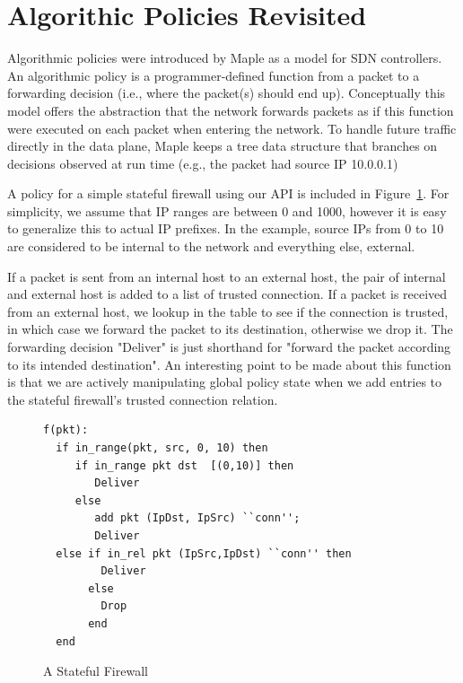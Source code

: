 \documentclass[preprint]{sigplanconf}
\begin{document}
\section*{Algorithic Policies Revisited}
Algorithmic policies were introduced by Maple as a model for SDN controllers. An algorithmic policy is a programmer-defined function from a packet to a forwarding decision (i.e., where the packet(s) should end up). Conceptually this model offers the abstraction that the network forwards packets as if this function were executed on each packet when entering the network. To handle future traffic directly in the data plane, Maple keeps a tree data structure that branches on decisions observed at run time (e.g., the packet had source IP 10.0.0.1)


A policy for a simple stateful firewall using our API is included in Figure~\ref{fig:firewallcode}. For simplicity, we assume that IP ranges are between 0 and 1000, however it is easy to generalize this to actual IP prefixes.
In the example, source IPs from 0 to 10 are considered to be internal to the network and everything else, external. 

If a packet is sent from an internal host to an external host, the pair of internal and external host is added to a list of trusted connection. If a packet is received from an external host, we lookup in the table to see if the connection is trusted, in which case we forward the packet to its destination, otherwise we drop it. The forwarding decision "Deliver" is just shorthand for "forward the packet according to its intended destination".
An interesting point to be made about this function is that we are actively manipulating global policy state when we add entries to the stateful firewall's trusted connection relation.


\begin{figure}[ht]
\begin{lstlisting}
f(pkt):
  if in_range(pkt, src, 0, 10) then
     if in_range pkt dst  [(0,10)] then
        Deliver
     else 
        add pkt (IpDst, IpSrc) ``conn'';
        Deliver
  else if in_rel pkt (IpSrc,IpDst) ``conn'' then
         Deliver
       else
         Drop
       end
  end                
  \end{lstlisting}

\caption{A Stateful Firewall}
\label{fig:firewallcode}
\end{figure}
\end{document}
